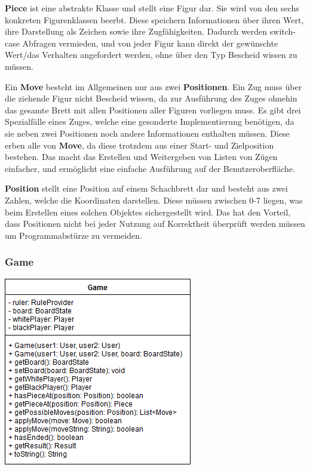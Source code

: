 \documentclass[parskip=full]{scrartcl}
\begin{document}
\begin{description}
					\item \textbf{Piece} ist eine abstrakte Klasse und stellt eine Figur dar. Sie wird von den sechs konkreten Figurenklassen beerbt. Diese speichern Informationen über ihren Wert, ihre Darstellung als Zeichen sowie ihre Zugfähigkeiten. Dadurch werden switch-case Abfragen vermieden, und von jeder Figur kann direkt der gewünschte Wert/das Verhalten angefordert werden, ohne über den Typ Bescheid wissen zu müssen.
					\item Ein \textbf{Move} besteht im Allgemeinen nur aus zwei \textbf{Positionen}. Ein Zug muss über die ziehende Figur nicht Bescheid wissen, da zur Ausführung des Zuges ohnehin das gesamte Brett mit allen Positionen aller Figuren vorliegen muss. Es gibt drei Spezialfälle eines Zuges, welche eine gesonderte Implementierung benötigen, da sie neben zwei Positionen noch andere Informationen enthalten müssen. Diese erben alle von \textbf{Move}, da diese trotzdem aus einer Start- und Zielposition bestehen. Das macht das Erstellen und Weitergeben von Listen von Zügen einfacher, und ermöglicht eine einfache Ausführung auf der Benutzeroberfläche.
					\item \textbf{Position} stellt eine Position auf einem Schachbrett dar und besteht aus zwei Zahlen, welche die Koordinaten darstellen. Diese müssen zwischen 0-7 liegen, was beim Erstellen eines solchen Objektes sichergestellt wird. Das hat den Vorteil, dass Positionen nicht bei jeder Nutzung auf Korrektheit überprüft werden müssen um Programmabstürze zu vermeiden.
				\end{description}		
		\newpage
		
		\subsubsection{Game}
		\begin{minipage}{\linewidth}
			\centering
			\includegraphics[width=1\linewidth]{Diagramme/Game}
			\label{fig:game}
		\end{minipage}
		
\end{document}
